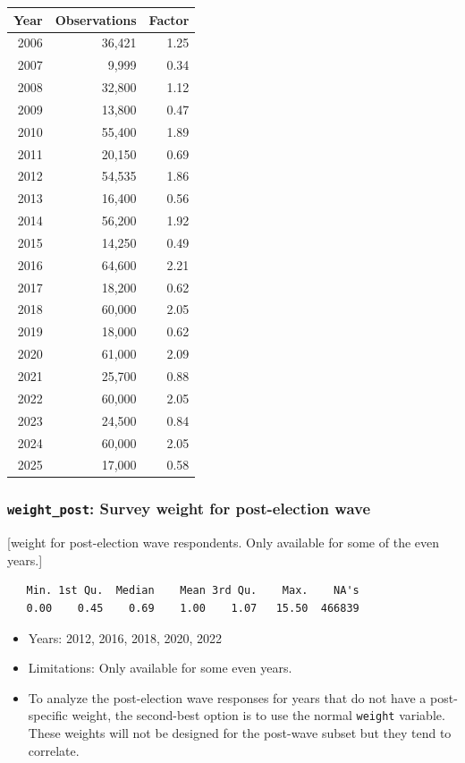 \documentclass[10pt,article,oneside]{memoir}
\begin{document}
\begin{center}

\begin{table}[H]
\centering
\begin{tabular}[t]{rrr}
\toprule
Year & Observations & Factor\\
\midrule
2006 & 36,421 & 1.25\\
2007 & 9,999 & 0.34\\
2008 & 32,800 & 1.12\\
2009 & 13,800 & 0.47\\
2010 & 55,400 & 1.89\\
2011 & 20,150 & 0.69\\
2012 & 54,535 & 1.86\\
2013 & 16,400 & 0.56\\
2014 & 56,200 & 1.92\\
2015 & 14,250 & 0.49\\
2016 & 64,600 & 2.21\\
2017 & 18,200 & 0.62\\
2018 & 60,000 & 2.05\\
2019 & 18,000 & 0.62\\
2020 & 61,000 & 2.09\\
2021 & 25,700 & 0.88\\
2022 & 60,000 & 2.05\\
2023 & 24,500 & 0.84\\
2024 & 60,000 & 2.05\\
2025 & 17,000 & 0.58\\
\bottomrule
\end{tabular}
\end{table}
\end{center}

\subsubsection{\texorpdfstring{\texttt{weight\_post}: Survey weight for
post-election
wave}{weight\_post: Survey weight for post-election wave}}\label{weight_post-survey-weight-for-post-election-wave}

{[}weight for post-election wave respondents. Only available for some of
the even years.{]}

\begin{verbatim}
   Min. 1st Qu.  Median    Mean 3rd Qu.    Max.    NA's 
   0.00    0.45    0.69    1.00    1.07   15.50  466839 
\end{verbatim}

\begin{itemize}
\tightlist
\item
  Years: 2012, 2016, 2018, 2020, 2022
\item
  Limitations: Only available for some even years.
\item
  To analyze the post-election wave responses for years that do not have
  a post-specific weight, the second-best option is to use the normal
  \texttt{weight} variable. These weights will not be designed for the
  post-wave subset but they tend to correlate.
\end{itemize}
\end{document}
